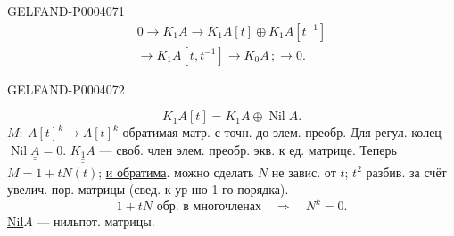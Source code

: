 \begin{GelfandAdjacentEvidence}{GELFAND-P000407}{1}
\begingroup\color{black}\begin{equation*}
\begin{aligned}
0\longrightarrow K_1A\longrightarrow K_1A[t]\oplus K_1A[t^{-1}]\\
{}\longrightarrow K_1A[t,t^{-1}]\longrightarrow K_0A\,;\longrightarrow0.
\end{aligned}
\end{equation*}\endgroup
{}
\end{GelfandAdjacentEvidence}
\begin{GelfandAdjacentEvidence}{GELFAND-P000407}{2}


\begingroup\color{black}\begin{equation*}
K_1A[t]=K_1A\oplus\operatorname{Nil}A.
\end{equation*}\endgroup
$M:\ A[t]^k\longrightarrow A[t]^k$ обратимая матр. с точн. до элем. преобр.
Для регул. колец $\underline{\underline{\operatorname{Nil}A=0}}$.
$\underline{\underline{K_1A}}$ — своб. член элем. преобр. экв. к ед. матрице.
Теперь $M=1+tN(t)$; \underline{и обратима}.
можно сделать $N$ не завис. от $t$; $t^2$ разбив. за счёт увелич. пор. матрицы
(свед. к ур-ню 1-го порядка).
\begingroup\color{black}\begin{equation*}
1+tN\text{ обр. в многочленах}\quad\Longrightarrow\quad N^k=0.
\end{equation*}\endgroup
\underline{Nil}$A$ — нильпот. матрицы.
\end{GelfandAdjacentEvidence}
